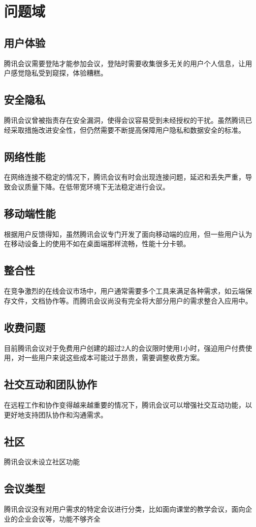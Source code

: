 \documentclass[a4paper,12pt]{article}
\begin{document}
    \section{问题域}
    \subsection{用户体验}
    腾讯会议需要登陆才能参加会议，登陆时需要收集很多无关的用户个人信息，让用户感觉隐私受到窥探，体验糟糕。
    \subsection{安全隐私}
    腾讯会议曾被指责存在安全漏洞，使得会议容易受到未经授权的干扰。虽然腾讯已经采取措施改进安全性，但仍然需要不断提高保障用户隐私和数据安全的标准。
    \subsection{网络性能}
    在网络连接不稳定的情况下，腾讯会议有时会出现连接问题，延迟和丢失严重，导致会议质量下降。在低带宽环境下无法稳定进行会议。
    \subsection{移动端性能}
    根据用户反馈得知，虽然腾讯会议专门开发了面向移动端的应用，但一些用户认为在移动设备上的使用不如在桌面端那样流畅，性能十分卡顿。
    \subsection{整合性}
    在竞争激烈的在线会议市场中，用户通常需要多个工具来满足各种需求，如云端保存文件，文档协作等。而腾讯会议尚没有完全将大部分用户的需求整合入应用中。
    \subsection{收费问题}
    目前腾讯会议对于免费用户创建的超过2人的会议限时使用1小时，强迫用户付费使用，对一些用户来说这些成本可能过于昂贵，需要调整收费方案。
    \subsection{社交互动和团队协作}
    在远程工作和协作变得越来越重要的情况下，腾讯会议可以增强社交互动功能，以更好地支持团队协作和沟通需求。
    \subsection{社区}
    腾讯会议未设立社区功能
    \subsection{会议类型}
    腾讯会议没有对用户需求的特定会议进行分类，比如面向课堂的教学会议，面向企业的企业会议等，功能不够齐全
\end{document}
